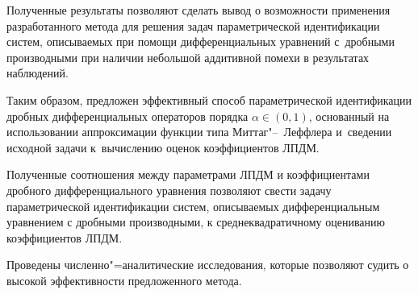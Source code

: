  	 		

Полученные результаты позволяют сделать вывод о возможности применения разработанного метода для решения задач параметрической идентификации систем, описываемых при помощи дифференциальных уравнений с~дробными производными при наличии небольшой аддитивной помехи в результатах наблюдений.



Таким образом,	предложен эффективный способ параметрической идентификации дробных дифференциальных операторов порядка $\alpha \in (0, 1)$, основанный на использовании аппроксимации функции типа Миттаг"--~Леффлера и~сведении исходной задачи к~вычислению оценок коэффициентов ЛПДМ. 

Полученные соотношения между параметрами ЛПДМ и коэффициентами дробного дифференциального уравнения	позволяют свести задачу параметрической идентификации систем, описываемых дифференциальным уравнением с дробными производными, к среднеквадратичному оцениванию коэффициентов ЛПДМ. 

Проведены численно"=аналитические исследования, которые позволяют судить о высокой эффективности предложенного метода. 





